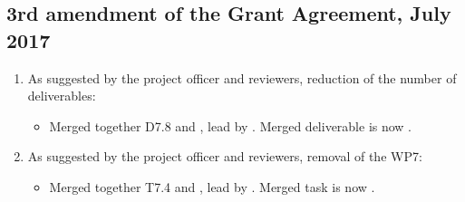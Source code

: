 \subsection*{3rd amendment of the Grant Agreement, July 2017}
\begin{enumerate}
\item As suggested by the project officer and reviewers, reduction of
  the number of deliverables:
  \begin{itemize}
  \item Merged together D7.8 and
    , lead by
    . Merged deliverable is now
    .
  \end{itemize}
\item As suggested by the project officer and reviewers, removal of the WP7:
  \begin{itemize}
  \item Merged together T7.4 and
    , lead by
    . Merged task is now
    .
  \end{itemize}
\end{enumerate}


\clearpage
\setcounter{page}{1}

